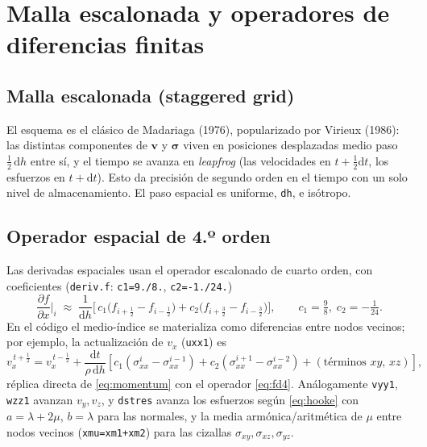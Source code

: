 \documentclass[11pt,a4paper]{article}
\newcommand{\dd}{\mathrm{d}}
\newcommand{\pd}[2]{\frac{\partial #1}{\partial #2}}
\newcommand{\half}{\tfrac{1}{2}}
\begin{document}
\section{Malla escalonada y operadores de diferencias finitas}

\subsection{Malla escalonada (staggered grid)}
El esquema es el clásico de Madariaga (1976), popularizado por Virieux (1986):
las distintas componentes de $\mathbf{v}$ y $\boldsymbol\sigma$ viven en
posiciones desplazadas medio paso $\half\,\dd h$ entre sí, y el tiempo se avanza
en \emph{leapfrog} (las velocidades en $t+\half\dd t$, los esfuerzos en
$t+\dd t$). Esto da precisión de segundo orden en el tiempo con un solo nivel de
almacenamiento. El paso espacial es uniforme, \texttt{dh}, e isótropo.

\subsection{Operador espacial de 4.º orden}
Las derivadas espaciales usan el operador escalonado de cuarto orden, con
coeficientes (\texttt{deriv.f}: \texttt{c1=9./8.}, \texttt{c2=-1./24.})
\begin{equation}
  \pd{f}{x}\bigg|_{i}
  \;\approx\;
  \frac{1}{\dd h}\Big[\,c_1\big(f_{i+\frac12}-f_{i-\frac12}\big)
                     + c_2\big(f_{i+\frac32}-f_{i-\frac32}\big)\Big],
  \qquad c_1=\tfrac{9}{8},\; c_2=-\tfrac{1}{24}.
  \label{eq:fd4}
\end{equation}
En el código el medio-índice se materializa como diferencias entre nodos
vecinos; por ejemplo, la actualización de $v_x$ (\texttt{uxx1}) es
\begin{equation}
  v_x^{\,t+\frac12} = v_x^{\,t-\frac12}
   + \frac{\dd t}{\rho\,\dd h}\!\left[
       c_1(\sigma_{xx}^{i}-\sigma_{xx}^{i-1})+c_2(\sigma_{xx}^{i+1}-\sigma_{xx}^{i-2})
       + (\text{términos } xy,\,xz)\right],
\end{equation}
réplica directa de \eqref{eq:momentum} con el operador \eqref{eq:fd4}.
Análogamente \texttt{vyy1}, \texttt{wzz1} avanzan $v_y,v_z$, y \texttt{dstres}
avanza los esfuerzos según \eqref{eq:hooke} con $a=\lambda+2\mu$, $b=\lambda$
para las normales, y la media armónica/aritmética de $\mu$ entre nodos vecinos
(\texttt{xmu=xm1+xm2}) para las cizallas $\sigma_{xy},\sigma_{xz},\sigma_{yz}$.
\end{document}
